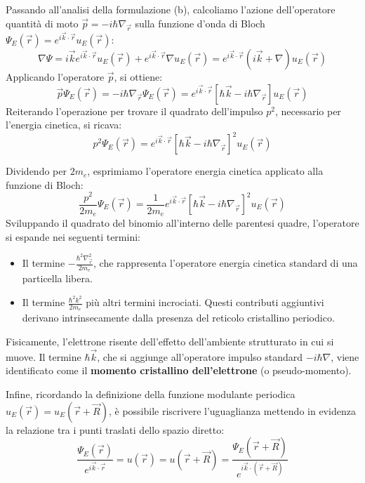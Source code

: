 Passando all'analisi della formulazione (b), calcoliamo l'azione dell'operatore quantità di moto \(\vec{p} = -i\hbar\nabla_{\vec{r}}\) sulla funzione d'onda di Bloch \(\Psi_E(\vec{r}) = e^{i\vec{k}\cdot\vec{r}} u_E(\vec{r})\):
\begin{equation}
    \nabla \Psi = i\vec{k}e^{i\vec{k}\cdot\vec{r}} u_E(\vec{r}) + e^{i\vec{k}\cdot\vec{r}} \nabla u_E(\vec{r}) = e^{i\vec{k}\cdot\vec{r}} (i\vec{k} + \nabla) u_E(\vec{r})
\end{equation}
Applicando l'operatore \(\vec{p}\), si ottiene:
\begin{equation}
    \vec{p} \Psi_E(\vec{r}) = -i\hbar \nabla_{\vec{r}} \Psi_E(\vec{r}) = e^{i\vec{k}\cdot\vec{r}} [\hbar\vec{k} - i\hbar\nabla_{\vec{r}}] u_E(\vec{r})
\end{equation}
Reiterando l'operazione per trovare il quadrato dell'impulso \(p^2\), necessario per l'energia cinetica, si ricava:
\begin{equation}
    p^2 \Psi_E(\vec{r}) = e^{i\vec{k}\cdot\vec{r}} [\hbar\vec{k} - i\hbar\nabla_{\vec{r}}]^2 u_E(\vec{r})
\end{equation}

Dividendo per \(2m_e\), esprimiamo l'operatore energia cinetica applicato alla funzione di Bloch:
\begin{equation}
    \frac{p^2}{2m_e} \Psi_E(\vec{r}) = \frac{1}{2m_e} e^{i\vec{k}\cdot\vec{r}} [\hbar\vec{k} - i\hbar\nabla_{\vec{r}}]^2 u_E(\vec{r})
\end{equation}
Sviluppando il quadrato del binomio all'interno delle parentesi quadre, l'operatore si espande nei seguenti termini:
\begin{itemize}
    \item Il termine \(-\frac{\hbar^2\nabla_{\vec{r}}^2}{2m_e}\), che rappresenta l'operatore energia cinetica standard di una particella libera.
    \item Il termine \(\frac{\hbar^2k^2}{2m_e}\) più altri termini incrociati. Questi contributi aggiuntivi derivano intrinsecamente dalla presenza del reticolo cristallino periodico.
\end{itemize}
Fisicamente, l'elettrone risente dell'effetto dell'ambiente strutturato in cui si muove. Il termine \(\hbar\vec{k}\), che si aggiunge all'operatore impulso standard \(-i\hbar\nabla\), viene identificato come il \textbf{momento cristallino dell'elettrone} (o pseudo-momento).

Infine, ricordando la definizione della funzione modulante periodica \(u_E(\vec{r}) = u_E(\vec{r} + \vec{R})\), è possibile riscrivere l'uguaglianza mettendo in evidenza la relazione tra i punti traslati dello spazio diretto:
\begin{equation}
    \frac{\Psi_E(\vec{r})}{e^{i\vec{k}\cdot\vec{r}}} = u(\vec{r}) = u(\vec{r} + \vec{R}) = \frac{\Psi_E(\vec{r} + \vec{R})}{e^{i\vec{k}\cdot(\vec{r} + \vec{R})}}
\end{equation}

